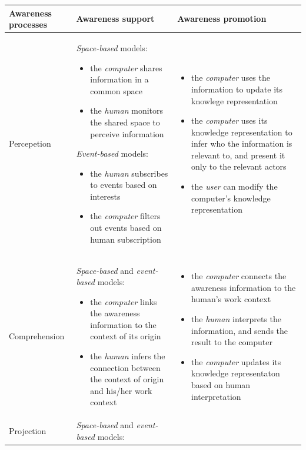{\footnotesize
\begin{longtable}{>{\raggedright}p{1.1in}>{\raggedright}p{2.2in}>{\raggedright}p{2.2in}}
\toprule 
\textbf{Awareness processes} & \textbf{Awareness support} & \textbf{Awareness promotion}\tabularnewline
\midrule 
Percepetion & \emph{Space-based} models: 
\begin{itemize}[nosep]
\item the \emph{computer} shares information in a common space
\item the \emph{human} monitors the shared space to perceive information
\end{itemize}
\emph{Event-based} models: 
\begin{itemize}[nosep]
\item the \emph{human} subscribes to events based on interests
\item the \emph{computer} filters out events based on human subscription \end{itemize}
 & \begin{itemize}[nosep]
\item the \emph{computer} uses the information to update its knowlege representation
\item the \emph{computer} uses its knowledge representation to infer who
the information is relevant to, and present it only to the relevant
actors
\item the \emph{user} can modify the computer's knowledge representation \end{itemize}
\tabularnewline
\midrule 
Comprehension & \emph{Space-based} and \emph{event-based} models:
\begin{itemize}[nosep]
\item the \emph{computer} links the awareness information to the context
of its origin
\item the \emph{human} infers the connection between the context of origin
and his/her work context\end{itemize}
 & \begin{itemize}[nosep]
\item the \emph{computer} connects the awareness information to the human's
work context 
\item the \emph{human} interprets the information, and sends the result
to the computer
\item the \emph{computer} updates its knowledge representaton based on human
interpretation\end{itemize}
\tabularnewline
\midrule 
Projection & \emph{Space-based} and \emph{event-based} models:

\end{longtable}}
